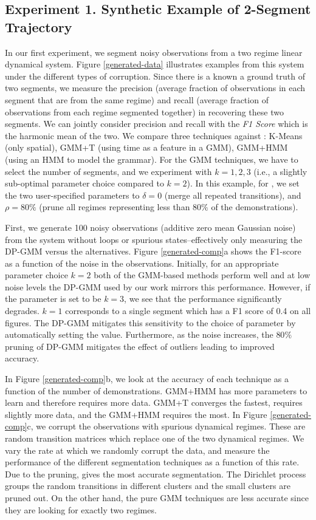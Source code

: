 \iffalse
\subsection{Experiment 1. Synthetic Example of 2-Segment Trajectory}\label{toy}
In our first experiment, we segment noisy observations from a two regime linear dynamical system. 
Figure \ref{generated-data} illustrates examples from this system under the different types of corruption.
Since there is a known a ground truth of two segments, we measure the precision (average fraction of observations in each segment that are from the same regime) and recall (average fraction of observations from each regime segmented together) in recovering these two segments.
We can jointly consider precision and recall with the \emph{F1 Score} which is the harmonic mean of the two.
We compare three techniques against \tsc: K-Means (only spatial), GMM+T (using time as a feature in a GMM), GMM+HMM (using an HMM to model the grammar).
For the GMM techniques, we have to select the number of segments, and we experiment with $k=1,2,3$ (i.e., a slightly sub-optimal parameter choice compared to $k=2$).
In this example, for \tsc, we set the two user-specified parameters to $\delta=0$ (merge all repeated transitions), and $\rho=80\%$ (prune all regimes representing less than $80\%$ of the demonstrations).

First, we generate 100 noisy observations (additive zero mean Gaussian noise) from the system without loops or spurious states--effectively only measuring the DP-GMM versus the alternatives.
Figure \ref{generated-comp}a shows the F1-score as a function of the noise in the observations.
Initially, for an appropriate parameter choice $k=2$ both of the GMM-based methods perform well and at low noise levels the DP-GMM used by our work mirrors this performance.
However, if the parameter is set to be $k=3$, we see that the performance significantly degrades.
$k=1$ corresponds to a single segment which has a F1 score of 0.4 on all figures.
The DP-GMM mitigates this sensitivity to the choice of parameter by automatically setting the value.
Furthermore, as the noise increases, the $80\%$ pruning of DP-GMM mitigates the effect of outliers leading to improved accuracy. 

In Figure \ref{generated-comp}b, we look at the accuracy of each technique as a function of the number of demonstrations.
GMM+HMM has more parameters to learn and therefore requires more data.
GMM+T converges the fastest, \tsc requires slightly more data, and the GMM+HMM requires the most.
In Figure \ref{generated-comp}c, we corrupt the observations with spurious dynamical regimes. These are random transition matrices which replace one of the two dynamical regimes.
We vary the rate at which we randomly corrupt the data, and measure the performance of the different segmentation techniques as a function of this rate.
Due to the pruning, \tsc gives the most accurate segmentation. 
The Dirichlet process groups the random transitions in different clusters and the small clusters are pruned out.
On the other hand, the pure GMM techniques are less accurate since they are looking for exactly two regimes.

